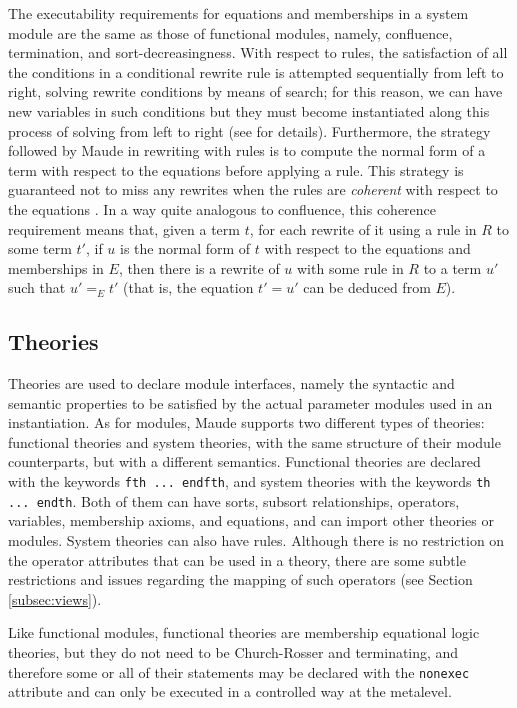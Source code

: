 The executability requirements for equations and memberships in a system
module are the same as those of functional modules, namely, confluence,
termination, and sort-decreasingness. With respect to rules, the satisfaction
of all the conditions in a conditional rewrite rule is attempted sequentially 
from left to right, solving rewrite conditions by means of search; 
for this reason, we can have new variables in such conditions but they
must become instantiated along this process of solving from left to right
(see \cite{maude-book} for details). Furthermore, the strategy followed
by Maude in rewriting with rules is to compute the normal form of a term
with respect to the equations before applying a rule. This strategy is
guaranteed not to miss any rewrites when the rules are \emph{coherent}
with respect to the equations \cite{eq-rl-rwl,maude-book}. In a way
quite analogous to confluence, this coherence requirement means that, given
a term $t$, for each rewrite of it using a rule in $R$ to some term $t'$,
if $u$ is the normal form of $t$ with respect to the equations and
memberships in $E$, then there is a rewrite of $u$ with some rule in
$R$ to a term $u'$ such that $u' =_E t'$ (that is, the equation $t' = u'$
can be deduced from $E$).

\subsection{Theories}\label{subsec:theories}

Theories are used to declare module interfaces, namely the syntactic
and  semantic properties to be satisfied by the actual parameter modules
used in an instantiation. As for modules, Maude supports two different types
of theories: functional theories and system theories, with the same structure
of their module counterparts, but with a different semantics. Functional
theories  are declared with the keywords \verb"fth ... endfth", and
system theories with the keywords \verb"th ... endth". Both of them can
have sorts, subsort relationships, operators, variables, membership axioms,
and equations, and can import other theories or modules. System theories can
also have rules. Although there is no restriction on the operator attributes
that can be used in a theory, there are some subtle restrictions and
issues regarding the mapping of such operators (see Section
\ref{subsec:views}).

Like functional modules, functional theories are membership equational
logic theories, but they do not need to be Church-Rosser and terminating,
and  therefore some or all of their statements may be declared with the
\verb"nonexec" attribute and can only be executed in a controlled way at 
the metalevel.

